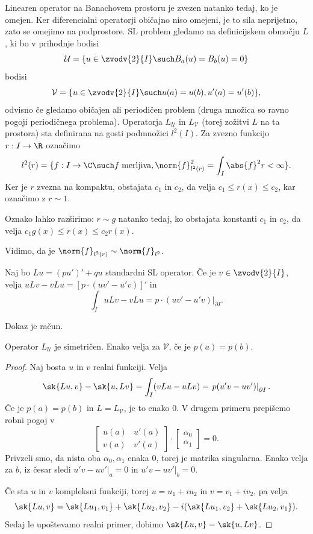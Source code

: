 Linearen operator na Banachovem prostoru je zvezen natanko tedaj, ko je omejen.
Ker diferencialni operatorji običajno niso omejeni, je to sila neprijetno, zato
se omejimo na podprostore.
SL problem gledamo na definicijskem območju $L$, ki bo v prihodnje bodisi
\[
  \mathcal{U} = \{u \in \zvodv{2}{I} \such B_a(u) = B_b(u) = 0\}
\]
bodisi
\[
  \mathcal{V} = \{u \in \zvodv{2}{I} \such u(a) = u(b), u'(a) = u'(b)\},
\]
odvisno če gledamo običajen ali periodičen problem (druga množica so ravno
pogoji periodičnega problema).
Operatorja $L_{\mathcal{U}}$ in $L_{\mathcal{V}}$ (torej zožitvi $L$ na ta
prostora) sta definirana na gosti podmnožici $l^2(I)$.
Za zvezno funkcijo $r: I \to \R$ označimo
\[
  l^2(r) = \{f: I \to \C \such f\;\text{merljiva},
  \norm{f}_{l^2(r)}^2 = \int_I \abs{f}^2 r < \infty \}.
\]
Ker je $r$ zvezna na kompaktu, obstajata $c_1$ in $c_2$, da velja $c_1 \le r(x)
\le c_2$, kar označimo z $r \sim 1$.

\begin{opomba}
  Oznako lahko razširimo: $r \sim g$ natanko tedaj, ko obstajata konstanti $c_1$
  in $c_2$, da velja $c_1 g(x) \le r(x) \le c_2 r(x)$.
\end{opomba}

Vidimo, da je $\norm{f}_{l^2(r)} \sim \norm{f}_{l^2}$.

\begin{trditev}
  Naj bo $Lu = (pu')' + qu$ standardni SL operator.
  Če je $v \in \zvodv{2}{I}$, velja $u L v - v L u = [p \cdot (u v' - u' v)]'$
  in
  \[
	\int_I u L v - v L u = \left. p \cdot (u v' - u' v) \right|_{\partial I}.
  \]
\end{trditev}

Dokaz je račun.

\begin{posledica}
  Operator $L_{\mathcal{U}}$ je simetričen.
  Enako velja za $\mathcal{V}$, če je $p(a) = p(b)$.
\end{posledica}

\begin{proof}
  Naj bosta $u$ in $v$ realni funkciji.
  Velja
  \[
	\sk{Lu, v} - \sk{u, Lv}
	= \int_I (vLu - uLv) = \left. p(u' v - u v') \right|_{\partial I}.
  \]
  Če je $p(a) = p(b)$ in $L = L_{\mathcal{V}}$, je to enako $0$.
  V drugem primeru prepišemo robni pogoj v
  \[
	\begin{bmatrix}
	  u(a) & u'(a) \\
	  v(a) & v'(a)
	\end{bmatrix}
	\cdot
	\begin{bmatrix}
	  \alpha_0 \\ \alpha_1
	\end{bmatrix}
	= 0.
  \]
  Privzeli smo, da nista oba $\alpha_0, \alpha_1$ enaka $0$, torej je matrika
  singularna.
  Enako velja za $b$, iz česar sledi $\left. u'v - uv' \right|_a = 0$ in $\left.
	u'v - u v' \right|_b = 0$.

  Če sta $u$ in $v$ kompleksni funkciji, torej $u = u_1 + i u_2$ in $v = v_1 + i
  v_2$, pa velja
  \[
	\sk{Lu, v} = \sk{Lu_1, v_1} + \sk{L u_2, v_2} -i (\sk{Lu_1, v_2} + \sk{L
	  u_2, v_1}).
  \]
  Sedaj le upoštevamo realni primer, dobimo $\sk{Lu, v} = \sk{u, Lv}$.
\end{proof}

